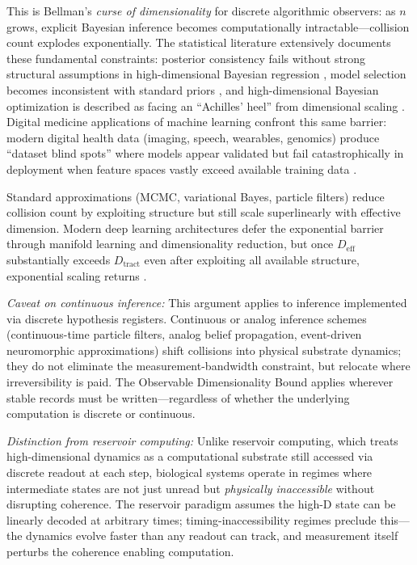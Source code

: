 \documentclass[12pt]{article}
\begin{document}
This is Bellman's \textit{curse of dimensionality} \cite{bellman1961} for discrete algorithmic observers: as $n$ grows, explicit Bayesian inference becomes computationally intractable---collision count explodes exponentially. The statistical literature extensively documents these fundamental constraints: posterior consistency fails without strong structural assumptions in high-dimensional Bayesian regression \cite{castillo2015}, model selection becomes inconsistent with standard priors \cite{johnson2012}, and high-dimensional Bayesian optimization is described as facing an ``Achilles' heel'' from dimensional scaling \cite{hvarfner2024}. Digital medicine applications of machine learning confront this same barrier: modern digital health data (imaging, speech, wearables, genomics) produce ``dataset blind spots'' where models appear validated but fail catastrophically in deployment when feature spaces vastly exceed available training data \cite{berisha2021}.

Standard approximations (MCMC, variational Bayes, particle filters) reduce collision count by exploiting structure but still scale superlinearly with effective dimension. Modern deep learning architectures defer the exponential barrier through manifold learning and dimensionality reduction, but once $D_{\text{eff}}$ substantially exceeds $D_{\text{tract}}$ even after exploiting all available structure, exponential scaling returns \cite{bengio2013}.

\textit{Caveat on continuous inference:} This argument applies to inference implemented via discrete hypothesis registers. Continuous or analog inference schemes (continuous-time particle filters, analog belief propagation, event-driven neuromorphic approximations) shift collisions into physical substrate dynamics; they do not eliminate the measurement-bandwidth constraint, but relocate where irreversibility is paid. The Observable Dimensionality Bound applies wherever stable records must be written---regardless of whether the underlying computation is discrete or continuous.

\textit{Distinction from reservoir computing:} Unlike reservoir computing, which treats high-dimensional dynamics as a computational substrate still accessed via discrete readout at each step, biological systems operate in regimes where intermediate states are not just unread but \textit{physically inaccessible} without disrupting coherence. The reservoir paradigm assumes the high-D state can be linearly decoded at arbitrary times; timing-inaccessibility regimes preclude this---the dynamics evolve faster than any readout can track, and measurement itself perturbs the coherence enabling computation.
\end{document}

